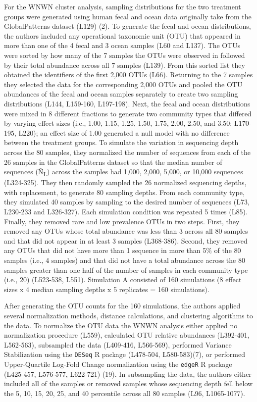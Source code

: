 \documentclass[
]{article}
\begin{document}
For the WNWN cluster analysis, sampling distributions for the two
treatment groups were generated using human fecal and ocean data
originally take from the GlobalPatterns dataset (L129) (2). To generate
the fecal and ocean distributions, the authors included any operational
taxonomic unit (OTU) that appeared in more than one of the 4 fecal and 3
ocean samples (L60 and L137). The OTUs were sorted by how many of the 7
samples the OTUs were observed in followed by their total abundance
across all 7 samples (L139). From this sorted list they obtained the
identifiers of the first 2,000 OTUs (L66). Returning to the 7 samples
they selected the data for the corresponding 2,000 OTUs and pooled the
OTU abundances of the fecal and ocean samples separately to create two
sampling distributions (L144, L159-160, L197-198). Next, the fecal and
ocean distributions were mixed in 8 different fractions to generate two
community types that differed by varying effect sizes (i.e., 1.00, 1.15,
1.25, 1.50, 1.75, 2.00, 2.50, and 3.50; L170-195, L220); an effect size
of 1.00 generated a null model with no difference between the treatment
groups. To simulate the variation in sequencing depth across the 80
samples, they normalized the number of sequences from each of the 26
samples in the GlobalPatterns dataset so that the median number of
sequences (Ñ\textsubscript{L}) across the samples had 1,000, 2,000,
5,000, or 10,000 sequences (L324-325). They then randomly sampled the 26
normalized sequencing depths, with replacement, to generate 80 sampling
depths. From each community type, they simulated 40 samples by sampling
to the desired number of sequences (L73, L230-233 and L326-327). Each
simulation condition was repeated 5 times (L85). Finally, they removed
rare and low prevalence OTUs in two steps. First, they removed any OTUs
whose total abundance was less than 3 across all 80 samples and that did
not appear in at least 3 samples (L368-386). Second, they removed any
OTUs that did not have more than 1 sequence in more than 5\% of the 80
samples (i.e., 4 samples) and that did not have a total abundance across
the 80 samples greater than one half of the number of samples in each
community type (i.e., 20) (L523-538, L551). Simulation A consisted of
160 simulations (8 effect sizes x 4 median sampling depths x 5
replicates = 160 simulations).

After generating the OTU counts for the 160 simulations, the authors
applied several normalization methods, distance calculations, and
clustering algorithms to the data. To normalize the OTU data the WNWN
analysis either applied no normalization procedure (L559), calculated
OTU relative abundances (L392-401, L562-563), subsampled the data
(L409-416, L566-569), performed Variance Stabilization using the
\texttt{DESeq} R package (L478-504, L580-583)(7), or performed
Upper-Quartile Log-Fold Change normalization using the \texttt{edgeR} R
package (L425-457, L576-577, L622-721) (19). In subsampling the data,
the authors either included all of the samples or removed samples whose
sequencing depth fell below the 5, 10, 15, 20, 25, and 40 percentile
across all 80 samples (L96, L1065-1077).
\end{document}
